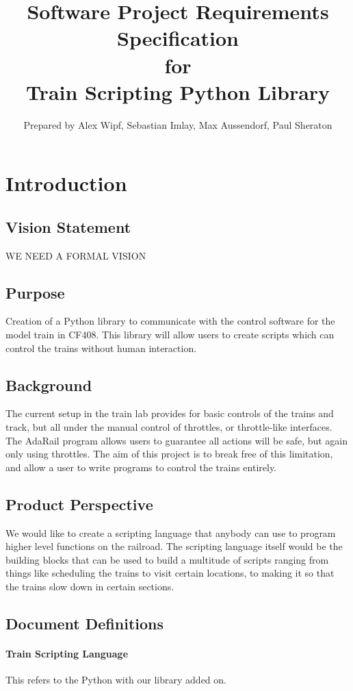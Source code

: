 \documentclass[a4paper,11pt,notitlepage]{article}
\title{{\bf Software Project Requirements Specification} \\ for \\ {\bf Train Scripting Python Library}}
\author{Prepared by Alex Wipf, Sebastian Imlay, Max Aussendorf, Paul Sheraton}
\def\TSL{Train Scripting Language\xspace}
\begin{document}
\maketitle
\pagebreak
\tableofcontents

\newpage
\section{Introduction}
\subsection{Vision Statement}
WE NEED A FORMAL VISION
\subsection{Purpose}
Creation of a Python library to communicate with the control software for the model train in CF408. This library will allow users to create scripts which can control the trains without human interaction.
\subsection{Background}
The current setup in the train lab provides for basic controls of the trains and track, but all under the manual control of throttles, or throttle-like interfaces. The AdaRail program allows users to guarantee all actions will be safe, but again only using throttles. The aim of this project is to break free of this limitation, and allow a user to write programs to control the trains entirely.
\subsection{Product Perspective}
We would like to create a scripting language that anybody can use to program higher level functions on the railroad. The scripting language itself would be the building blocks that can be used to build a multitude of scripts ranging from things like scheduling the trains to visit certain locations, to making it so that the trains slow down in certain sections.
\subsection{Document Definitions}
\paragraph{\TSL} This refers to the Python with our library added on.
\end{document}
